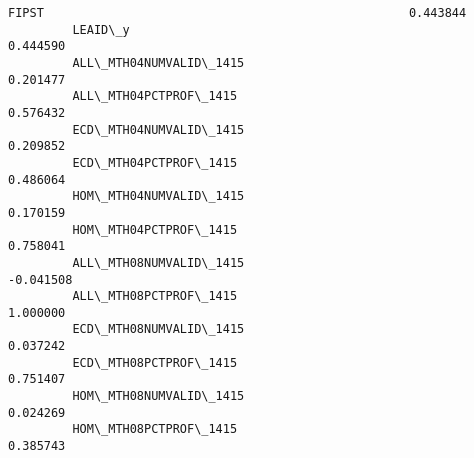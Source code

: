 \documentclass[11pt]{article}
\begin{document}
\begin{Verbatim}[commandchars=\\\{\}]
         FIPST                                                   0.443844   
         LEAID\_y                                                 0.444590   
         ALL\_MTH04NUMVALID\_1415                                  0.201477   
         ALL\_MTH04PCTPROF\_1415                                   0.576432   
         ECD\_MTH04NUMVALID\_1415                                  0.209852   
         ECD\_MTH04PCTPROF\_1415                                   0.486064   
         HOM\_MTH04NUMVALID\_1415                                  0.170159   
         HOM\_MTH04PCTPROF\_1415                                   0.758041   
         ALL\_MTH08NUMVALID\_1415                                 -0.041508   
         ALL\_MTH08PCTPROF\_1415                                   1.000000   
         ECD\_MTH08NUMVALID\_1415                                  0.037242   
         ECD\_MTH08PCTPROF\_1415                                   0.751407   
         HOM\_MTH08NUMVALID\_1415                                  0.024269   
         HOM\_MTH08PCTPROF\_1415                                   0.385743   
         

\end{Verbatim}
\end{document}
